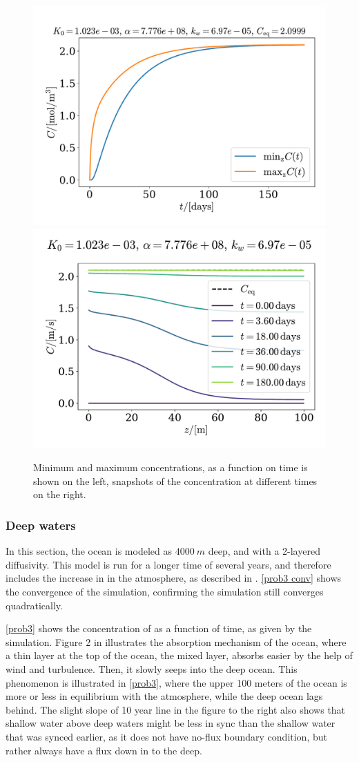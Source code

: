 \documentclass{article}
\begin{document}
    \begin{figure}[H]
        \centering
        \includegraphics[width=.49\textwidth]{../plots/prob2_minmax}
        \includegraphics[width=.49\textwidth]{../plots/prob2_i}
        \caption{Minimum and maximum concentrations, as a function on time is shown on the left, snapshots of the concentration at different times on the right.}
        \label{prob2 minmax}
    \end{figure}

    \subsubsection*{Deep waters}

    In this section, the ocean is modeled as $\SI{4000}{m}$ deep, and with a 2-layered diffusivity. This model is run for a longer time of several years, and therefore includes the increase in  in the atmosphere, as described in \cite{exercise}. \autoref{prob3 conv} shows the convergence of the simulation, confirming the simulation still converges quadratically.

    \autoref{prob3} shows the concentration of  as a function of time, as given by the simulation. Figure 2 in \cite{exercise} illustrates the absorption mechanism of the ocean, where a thin layer at the top of the ocean, the mixed layer, absorbs  easier by the help of wind and turbulence. Then, it slowly seeps into the deep ocean. This phenomenon is illustrated in \autoref{prob3}, where the upper 100 meters of the ocean is more or less in equilibrium with the atmosphere, while the deep ocean lags behind. The slight slope of 10 year line in the figure to the right also shows that shallow water above deep waters might be less in sync than the shallow water that was synced earlier, as it does not have no-flux boundary condition, but rather always have a flux down in to the deep. 
    
\end{document}
